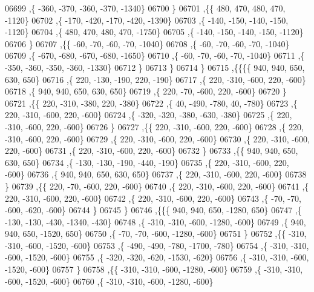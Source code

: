 \begin{DoxyCode}
06699     ,\{  -360,  -370,  -360,  -370, -1340\}
06700     \}
06701    ,\{\{   480,   470,   480,   470, -1120\}
06702     ,\{  -170,  -420,  -170,  -420, -1390\}
06703     ,\{  -140,  -150,  -140,  -150, -1120\}
06704     ,\{   480,   470,   480,   470, -1750\}
06705     ,\{  -140,  -150,  -140,  -150, -1120\}
06706     \}
06707    ,\{\{   -60,   -70,   -60,   -70, -1040\}
06708     ,\{   -60,   -70,   -60,   -70, -1040\}
06709     ,\{  -670,  -680,  -670,  -680, -1650\}
06710     ,\{   -60,   -70,   -60,   -70, -1040\}
06711     ,\{  -350,  -360,  -350,  -360, -1330\}
06712     \}
06713    \}
06714   \}
06715  ,\{\{\{\{   940,   940,   650,   630,   650\}
06716     ,\{   220,  -130,  -190,   220,  -190\}
06717     ,\{   220,  -310,  -600,   220,  -600\}
06718     ,\{   940,   940,   650,   630,   650\}
06719     ,\{   220,   -70,  -600,   220,  -600\}
06720     \}
06721    ,\{\{   220,  -310,  -380,   220,  -380\}
06722     ,\{    40,  -490,  -780,    40,  -780\}
06723     ,\{   220,  -310,  -600,   220,  -600\}
06724     ,\{  -320,  -320,  -380,  -630,  -380\}
06725     ,\{   220,  -310,  -600,   220,  -600\}
06726     \}
06727    ,\{\{   220,  -310,  -600,   220,  -600\}
06728     ,\{   220,  -310,  -600,   220,  -600\}
06729     ,\{   220,  -310,  -600,   220,  -600\}
06730     ,\{   220,  -310,  -600,   220,  -600\}
06731     ,\{   220,  -310,  -600,   220,  -600\}
06732     \}
06733    ,\{\{   940,   940,   650,   630,   650\}
06734     ,\{  -130,  -130,  -190,  -440,  -190\}
06735     ,\{   220,  -310,  -600,   220,  -600\}
06736     ,\{   940,   940,   650,   630,   650\}
06737     ,\{   220,  -310,  -600,   220,  -600\}
06738     \}
06739    ,\{\{   220,   -70,  -600,   220,  -600\}
06740     ,\{   220,  -310,  -600,   220,  -600\}
06741     ,\{   220,  -310,  -600,   220,  -600\}
06742     ,\{   220,  -310,  -600,   220,  -600\}
06743     ,\{   -70,   -70,  -600,  -620,  -600\}
06744     \}
06745    \}
06746   ,\{\{\{   940,   940,   650, -1280,   650\}
06747     ,\{  -130,  -130,  -430, -1340,  -430\}
06748     ,\{  -310,  -310,  -600, -1280,  -600\}
06749     ,\{   940,   940,   650, -1520,   650\}
06750     ,\{   -70,   -70,  -600, -1280,  -600\}
06751     \}
06752    ,\{\{  -310,  -310,  -600, -1520,  -600\}
06753     ,\{  -490,  -490,  -780, -1700,  -780\}
06754     ,\{  -310,  -310,  -600, -1520,  -600\}
06755     ,\{  -320,  -320,  -620, -1530,  -620\}
06756     ,\{  -310,  -310,  -600, -1520,  -600\}
06757     \}
06758    ,\{\{  -310,  -310,  -600, -1280,  -600\}
06759     ,\{  -310,  -310,  -600, -1520,  -600\}
06760     ,\{  -310,  -310,  -600, -1280,  -600\}

\end{DoxyCode}
